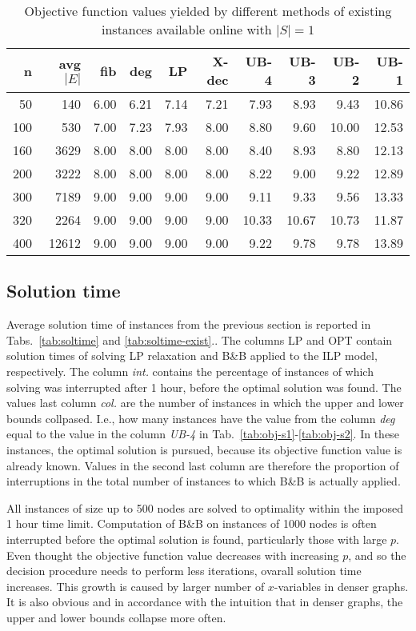 \begin{table}[]
\centering
\begin{tabular}{rrrrrrrrrr}
n     &	avg $|E|$ & fib  & deg  & LP    & X-dec & UB-4  & UB-3  & UB-2  & UB-1  \\
\hline
  50 & 140  & 6.00 & 6.21 & 7.14 & 7.21 & 7.93 & 8.93  & 9.43  & 10.86 \\
 100 & 530  & 7.00 & 7.23 & 7.93 & 8.00 & 8.80 & 9.60  & 10.00 & 12.53 \\
 160 &3629  & 8.00 & 8.00 & 8.00 & 8.00 & 8.40 & 8.93  & 8.80  & 12.13 \\
 200 &3222  & 8.00 & 8.00 & 8.00 & 8.00 & 8.22 & 9.00  & 9.22  & 12.89 \\
 300 &7189  & 9.00 & 9.00 & 9.00 & 9.00 & 9.11 & 9.33  & 9.56  & 13.33 \\
 320 &2264  & 9.00 & 9.00 & 9.00 & 9.00 &10.33 &10.67  &10.73  & 11.87 \\
 400 &12612 & 9.00 & 9.00 & 9.00 & 9.00 & 9.22 & 9.78  & 9.78  & 13.89 \\
\end{tabular}
\caption{Objective function values yielded by different methods of existing instances available online with $|S|=1$}
\label{tab:obj-exist}
\end{table}


\subsection{Solution time}

Average solution time of instances from the previous section is reported in Tabs.~\ref{tab:soltime} and \ref{tab:soltime-exist}..
The columns LP and OPT contain solution times of solving LP relaxation and B\&B applied to the ILP model, respectively.
The column \emph{int.} contains the percentage of instances of which solving was interrupted after 1 hour, before the optimal solution was found.
The values last column \emph{col.} are the number of instances in which the upper and lower bounds collpased. 
I.e., how many instances have the value from the column \emph{deg} equal to the value in the column \emph{UB-4} in Tab.~\ref{tab:obj-s1}-\ref{tab:obj-s2}.
In these instances, the optimal solution is pursued, because its objective function value is already known.
Values in the second last column are therefore the proportion of interruptions in the total number of instances to which B\&B is actually applied.

All instances of size up to 500 nodes are solved to optimality within the imposed 1 hour time limit.
Computation of B\&B on instances of 1000 nodes is often interrupted before the optimal solution is found, particularly those with large $p$.
Even thought the objective function value decreases with increasing $p$, and so the decision procedure needs to perform less iterations, ovarall solution time increases.
This growth is caused by larger number of $x$-variables in denser graphs.
It is also obvious and in accordance with the intuition that in denser graphs, the upper and lower bounds collapse more often.

